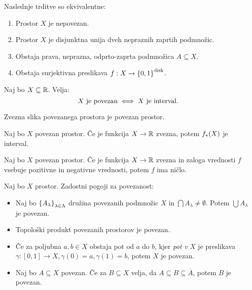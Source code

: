 \begin{trditev}
    Naslednje trditve so ekvivalentne:
    \begin{enumerate}
        \item Prostor $X$ je nepovezan.
        \item Prostor $X$ je disjunktna unija dveh nepraznih zaprtih podmnožic.
        \item Obstaja prava, neprazna, odprto-zaprta podmnožica $A \subseteq X$.
        \item Obstaja surjektivna preslikava $f: X \to \left\{0,1\right\}^\text{disk}$. 
    \end{enumerate}
\end{trditev}

\begin{izrek}
    Naj bo $X \subseteq \mathbb{R}$. Velja: $$X \text{ je povezan} \iff X \text{ je interval}.$$
\end{izrek}

\begin{izrek}
    Zvezna slika povezanega prostora je povezan prostor.
\end{izrek}

\begin{izrek}
    Naj bo $X$ povezan prostor. Če je funkcija $X \to \mathbb{R}$ zvezna, potem $f_{*}(X)$ je interval.
\end{izrek}

\begin{posledica}
    Naj bo $X$ povezan prostor. Če je funkcija $X \to \mathbb{R}$ zvezna in zaloga vrednosti $f$ vsebuje pozitivne in negativne vrednosti, potem $f$ ima ničlo.
\end{posledica}

\begin{izrek}
    Naj bo $X$ prostor. Zadostni pogoji za povezanost:
    \begin{itemize}
        \item Naj bo $\left\{A_\lambda\right\}_{\lambda \in \Lambda}$ družina povezanih podmnožic $X$ in $\bigcap A_\lambda \neq \emptyset$. Potem $\bigcup A_\lambda$ je povezan.
        \item Topološki produkt povezanih prostorov je povezan.
        \item Če za poljubna $a,b \in X$ obstaja pot od $a$ do $b$, kjer \emph{pot v $X$} je preslikava $\gamma: [0,1] \to X, \gamma(0) = a, \gamma(1) = b$, potem $X$ je povezan.
        \item Naj bo $A \subseteq X$ povezan. Če za $B \subseteq X$ velja, da $A \subseteq B \subseteq \overline{A}$, potem $B$ je povezan.
    \end{itemize}
\end{izrek}


